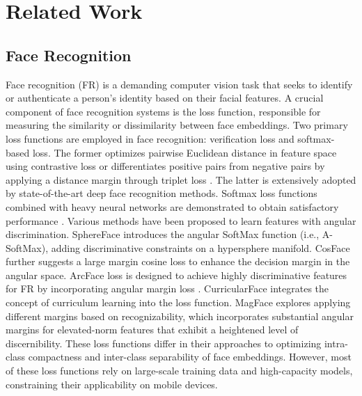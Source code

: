 \documentclass[sigconf]{acmart}
\begin{document}
\section{Related Work}
\subsection{Face Recognition}
Face recognition (FR) is a demanding computer vision task that seeks to identify or authenticate a person's identity based on their facial features. A crucial component of face recognition systems is the loss function, responsible for measuring the similarity or dissimilarity between face embeddings. Two primary loss functions are employed in face recognition: verification loss and softmax-based loss. The former optimizes pairwise Euclidean distance in feature space using contrastive loss \cite{contrastive1,contrastive2} or differentiates positive pairs from negative pairs by applying a distance margin through triplet loss \cite{facenet,tripletnet}. The latter is extensively adopted by state-of-the-art deep face recognition methods.
Softmax loss functions combined with heavy neural networks are demonstrated to obtain satisfactory performance \cite{arcface}. Various methods have been proposed to learn features with angular discrimination. SphereFace \cite{sphereface} introduces the angular SoftMax function (i.e., A-SoftMax), adding discriminative constraints on a hypersphere manifold. CosFace \cite{cosface} further suggests a large margin cosine loss to enhance the decision margin in the angular space. ArcFace loss is designed to achieve highly discriminative features for FR by incorporating angular margin loss \cite{arcface}. CurricularFace \cite{curricularface} integrates the concept of curriculum learning into the loss function. MagFace \cite{magface} explores applying different margins based on recognizability, which incorporates substantial angular margins for elevated-norm features that exhibit a heightened level of discernibility. These loss functions differ in their approaches to optimizing intra-class compactness and inter-class separability of face embeddings. However, most of these loss functions rely on large-scale training data and high-capacity models, constraining their applicability on mobile devices.
\end{document}
